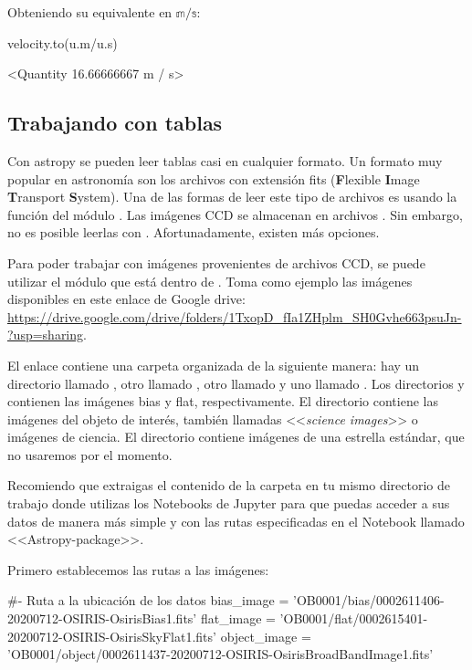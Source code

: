 Obteniendo su equivalente en $ \mathbb{m/s} $:

\begin{pyin}
velocity.to(u.m/u.s)
\end{pyin}
\begin{pyout}
<Quantity 16.66666667 m / s>
\end{pyout}

\subsection{Trabajando con tablas}
Con astropy se pueden leer tablas casi en cualquier formato. Un formato muy popular en astronomía son los archivos con extensión fits (\textbf{F}lexible \textbf{I}mage \textbf{T}ransport \textbf{S}ystem). Una de las formas de leer este tipo de archivos es usando la función  del módulo . Las imágenes CCD se almacenan en archivos . Sin embargo, no es posible leerlas con . Afortunadamente, existen más opciones. 

Para poder trabajar con imágenes  provenientes de archivos CCD, se puede utilizar el módulo  que está dentro de . Toma como ejemplo las imágenes disponibles en este enlace de Google drive: \url{https://drive.google.com/drive/folders/1TxopD_fIa1ZHplm_SH0Gvhe663psuJn-?usp=sharing}.

El enlace contiene una carpeta organizada de la siguiente manera: hay un directorio llamado , otro llamado , otro llamado  y uno llamado . Los directorios  y  contienen las imágenes bias y flat, respectivamente. El directorio  contiene las imágenes del objeto de interés, también llamadas <<\emph{science images}>> o imágenes de ciencia. El directorio  contiene imágenes de una estrella estándar, que no usaremos por el momento. 

Recomiendo que extraigas el contenido de la carpeta en tu mismo directorio de trabajo donde utilizas los Notebooks de Jupyter para que puedas acceder a sus datos de manera más simple y con las rutas especificadas en el Notebook llamado <<Astropy-package>>. 

Primero establecemos las rutas a las imágenes:
\begin{pyin}[]
#- Ruta a la ubicación de los datos
bias_image = 'OB0001/bias/0002611406-20200712-OSIRIS-OsirisBias1.fits'
flat_image = 'OB0001/flat/0002615401-20200712-OSIRIS-OsirisSkyFlat1.fits'
object_image = 'OB0001/object/0002611437-20200712-OSIRIS-OsirisBroadBandImage1.fits'  
\end{pyin}


